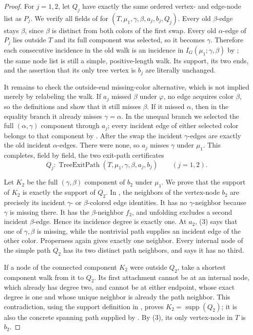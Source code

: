 \begin{proof}
For $j=1,2$, let $Q_j$ have exactly the same ordered vertex- and
edge-node list as $P_j$.  We verify all fields of
 for $(T,\mu_1,\gamma,\beta,a_j,b_j,Q_j)$.
Every old $\beta$-edge stays $\beta$, since $\beta$ is distinct from both
colors of the first swap.  Every old $\alpha$-edge of $P_j$ lies outside
$T$ and its full component was selected, so it becomes $\gamma$.
Therefore each consecutive incidence in the old walk is an incidence in
$I_G(\mu_1;\gamma,\beta)$ by
; the same node list is still a simple,
positive-length walk.  Its support, its two ends, and the assertion that
its only tree vertex is $b_j$ are literally unchanged.

It remains to check the outside-end missing-color alternative, which is
not implied merely by relabeling the walk.  If $a_j$ missed $\beta$ under
$\varphi$, no edge acquires color $\beta$, so the definitions
 and  show that it still
misses $\beta$.  If it missed $\alpha$, then in the equality branch it
already misses $\gamma=\alpha$.  In the unequal branch we selected the
full $(\alpha,\gamma)$ component through $a_j$; every incident edge of
either selected color belongs to that component by
.  After the swap the incident
$\gamma$-edges are exactly the old incident $\alpha$-edges.  There were
none, so $a_j$ misses $\gamma$ under $\mu_1$.  This completes, field by
field, the two exit-path certificates
\[
       Q_j:\operatorname{TreeExitPath}
         (T,\mu_1,\gamma,\beta,a_j,b_j)\qquad(j=1,2).          \tag{3}
\]

Let $K_2$ be the full $(\gamma,\beta)$ component of $b_2$ under
$\mu_1$.  We prove that the support of $K_2$ is exactly the support of
$Q_2$.  In , the neighbors of the
vertex-node $b_2$ are precisely its incident $\gamma$- or
$\beta$-colored edge identities.  It has no $\gamma$-neighbor because
$\gamma$ is missing there.  It has the $\beta$-neighbor $f_2$, and
unfolding  excludes a second incident
$\beta$-edge.  Hence its incidence degree is exactly one.  At $a_2$,
(3) says that one of $\gamma,\beta$ is missing, while the nontrivial path
supplies an incident edge of the other color.  Properness again gives
exactly one neighbor.  Every internal node of the simple path $Q_2$ has
its two distinct path neighbors, and
 says it has no third.

If a node of the connected component $K_2$ were outside $Q_2$, take a
shortest component walk from it to $Q_2$.  Its first attachment cannot be
at an internal node, which already has degree two, and cannot be at either
endpoint, whose exact degree is one and whose unique neighbor is already
the path neighbor.  This contradiction, using the support definition in
, proves $K_2=\operatorname{supp}(Q_2)$; it is
also the concrete spanning path supplied by
.  By (3), its only vertex-node in
$T$ is $b_2$.


\end{proof}

